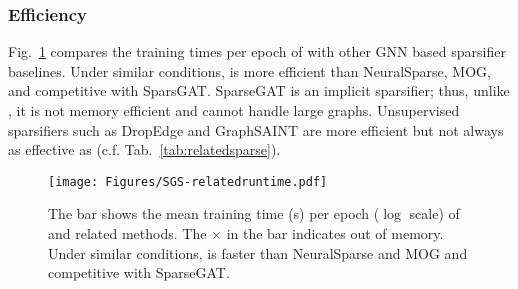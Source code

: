 \subsubsection{Efficiency}
\label{subsubsec:runtime}
Fig.~\ref{fig:runtime} compares the training times per epoch of \sgs with other GNN based sparsifier baselines. Under similar conditions, \sgs is more efficient than NeuralSparse, MOG, and competitive with SparsGAT. SparseGAT is an implicit sparsifier; thus, unlike \sgs, it is not memory efficient and cannot handle large graphs. Unsupervised sparsifiers such as DropEdge and GraphSAINT are more efficient but not always as effective as \sgs (c.f. Tab.~\ref{tab:relatedsparse}). 

\begin{figure}[!htbp]
\centering
\texttt{[image: Figures/SGS-relatedruntime.pdf]}
\caption{The bar shows the mean training time (s) per epoch ($\log$ scale) of \sgs and related methods. The $\times$ in the bar indicates out of memory. Under similar conditions, \sgs is faster than NeuralSparse and MOG and competitive with SparseGAT.}
\label{fig:runtime}
\end{figure}
% 
% 
% 